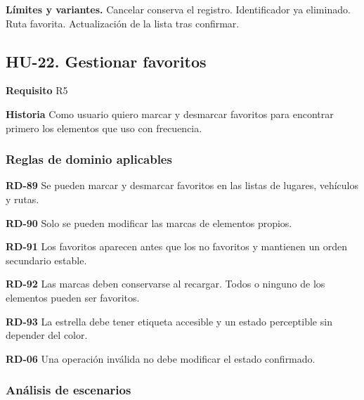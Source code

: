 {\fontsize{9}{11.8}\selectfont\textbf{Límites y variantes.} Cancelar conserva el registro. Identificador ya eliminado. Ruta favorita. Actualización de la lista tras confirmar.\par}\vspace{4pt}
\clearpage\subsection*{HU-22. Gestionar favoritos}

\textbf{Requisito} R5\par

\textbf{Historia} Como usuario quiero marcar y desmarcar favoritos para encontrar primero los elementos que uso con frecuencia.\par

\subsubsection*{Reglas de dominio aplicables}

\textbf{RD-89} Se pueden marcar y desmarcar favoritos en las listas de lugares, vehículos y rutas.\par

\textbf{RD-90} Solo se pueden modificar las marcas de elementos propios.\par

\textbf{RD-91} Los favoritos aparecen antes que los no favoritos y mantienen un orden secundario estable.\par

\textbf{RD-92} Las marcas deben conservarse al recargar. Todos o ninguno de los elementos pueden ser favoritos.\par

\textbf{RD-93} La estrella debe tener etiqueta accesible y un estado perceptible sin depender del color.\par

\textbf{RD-06} Una operación inválida no debe modificar el estado confirmado.\par

\subsubsection*{Análisis de escenarios}

